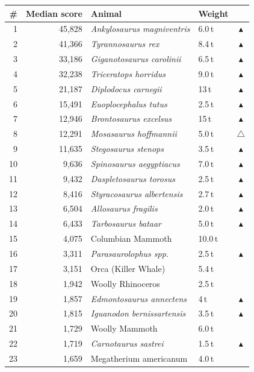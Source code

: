 \documentclass[11pt]{article}
\begin{document}
\small
\begin{longtable}{rrllc}
\toprule
\# & Median score & Animal & Weight & \\
\midrule
\endhead
1 & 45,828 & \textit{Ankylosaurus magniventris} & 6.0\,t & $\blacktriangle$ \\
2 & 41,366 & \textit{Tyrannosaurus rex} & 8.4\,t & $\blacktriangle$ \\
3 & 33,186 & \textit{Giganotosaurus carolinii} & 6.5\,t & $\blacktriangle$ \\
4 & 32,238 & \textit{Triceratops horridus} & 9.0\,t & $\blacktriangle$ \\
5 & 21,187 & \textit{Diplodocus carnegii} & 13\,t & $\blacktriangle$ \\
6 & 15,491 & \textit{Euoplocephalus tutus} & 2.5\,t & $\blacktriangle$ \\
7 & 12,946 & \textit{Brontosaurus excelsus} & 15\,t & $\blacktriangle$ \\
8 & 12,291 & \textit{Mosasaurus hoffmannii} & 5.0\,t & $\triangle$ \\
9 & 11,635 & \textit{Stegosaurus stenops} & 3.5\,t & $\blacktriangle$ \\
10 & 9,636 & \textit{Spinosaurus aegyptiacus} & 7.0\,t & $\blacktriangle$ \\
11 & 9,432 & \textit{Daspletosaurus torosus} & 2.5\,t & $\blacktriangle$ \\
12 & 8,416 & \textit{Styracosaurus albertensis} & 2.7\,t & $\blacktriangle$ \\
13 & 6,504 & \textit{Allosaurus fragilis} & 2.0\,t & $\blacktriangle$ \\
14 & 6,433 & \textit{Tarbosaurus bataar} & 5.0\,t & $\blacktriangle$ \\
15 & 4,075 & Columbian Mammoth & 10.0\,t &  \\
16 & 3,311 & \textit{Parasaurolophus spp.} & 2.5\,t & $\blacktriangle$ \\
17 & 3,151 & Orca (Killer Whale) & 5.4\,t &  \\
18 & 1,942 & Woolly Rhinoceros & 2.5\,t &  \\
19 & 1,857 & \textit{Edmontosaurus annectens} & 4\,t & $\blacktriangle$ \\
20 & 1,815 & \textit{Iguanodon bernissartensis} & 3.5\,t & $\blacktriangle$ \\
21 & 1,729 & Woolly Mammoth & 6.0\,t &  \\
22 & 1,719 & \textit{Carnotaurus sastrei} & 1.5\,t & $\blacktriangle$ \\
23 & 1,659 & Megatherium americanum & 4.0\,t &  \\

\end{longtable}
\end{document}
